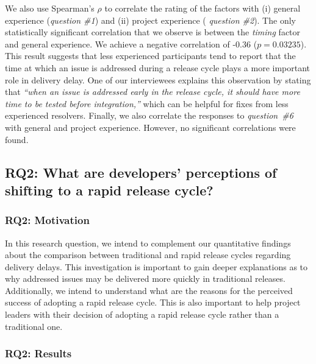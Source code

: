 \begin{sloppypar}
We also use Spearman's $\rho$ to correlate the rating of the factors with (i)
general experience ({\em question \#1}) and (ii) project experience ({\em
question \#2}). The only statistically significant correlation that we observe is
between the {\em timing} factor and general experience. We achieve a negative
correlation of -0.36 ($p=0.03235$). This result suggests that less
experienced participants tend to report that the time at which an issue is
addressed during a release cycle plays a more important role in delivery
delay. One of our interviewees explains this observation by stating that {\em
``when an issue is addressed early in the release cycle, it should have more
time to be tested before integration,''} which can be helpful for fixes
from less experienced resolvers. Finally, we also correlate the responses
to {\em question~\#6} with general and project experience. However, no
significant correlations were found.\\
\end{sloppypar}


\subsection{RQ2: What are developers' perceptions of shifting to a
rapid release cycle?}\label{ch5:rq2}

\subsubsection*{RQ2: Motivation}

In this research question, we intend to complement our quantitative findings
about the comparison between traditional and rapid release cycles regarding
delivery delays. This investigation is important to gain deeper explanations as
to why addressed issues may be delivered more quickly in traditional releases.
Additionally, we intend to understand what are the reasons for the perceived
success of adopting a rapid release cycle. This is also important to help
project leaders with their decision of adopting a rapid release cycle rather
than a traditional one. \\

\subsubsection*{RQ2: Results}

